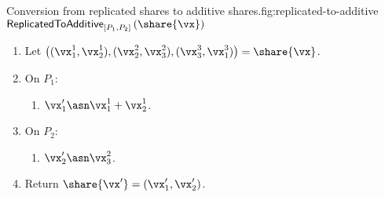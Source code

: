\begin{Boxfig}{Conversion from replicated shares to additive shares.}{fig:replicated-to-additive}
  {$\mathsf{ReplicatedToAdditive}_{[P_1, P_2]}\left( \share{\vx} \right)$}
  
  \begin{enumerate}
  
  \item Let $\left( (\vx_1^1, \vx_2^1), (\vx_2^2, \vx_3^2), (\vx_3^3, \vx_1^3) \right) = \share{\vx}$.
  
  \item On $P_1$:
    \begin{enumerate}
    \item $\vx'_1 \asn \vx^1_1 + \vx^1_2$.
    \end{enumerate}
    
  \item On $P_2$:
    \begin{enumerate}
    \item $\vx'_2 \asn \vx^2_3$.
    \end{enumerate}
  
  \item Return $\share{\vx'} = (\vx'_1, \vx'_2)$.
\end{enumerate}
\end{Boxfig}








